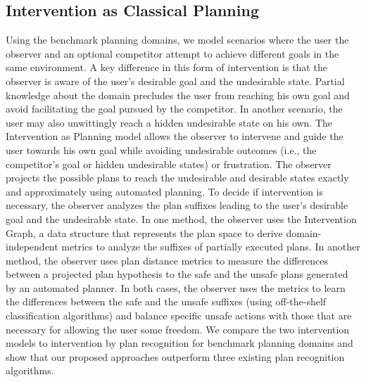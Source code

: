 \subsection{Intervention as Classical Planning}
Using the benchmark planning domains, we model scenarios where the user the observer and an optional competitor attempt to achieve different goals in the same environment.
A key difference in this form of intervention is that the observer is aware of  the user's desirable goal and the undesirable state.
Partial knowledge about the domain precludes the user from reaching his own goal and avoid facilitating the goal pursued by the competitor.
In another scenario, the user may also unwittingly reach a hidden undesirable state on his own.
The Intervention as Planning model allows the observer to intervene and guide the user towards his own goal while avoiding undesirable outcomes (i.e., the competitor's goal or hidden undesirable states) or frustration.
The observer projects the possible plans to reach the undesirable and desirable states exactly and approximately using automated planning.
To decide if intervention is necessary, the observer analyzes the plan suffixes leading to the user's desirable goal and the undesirable state.
In one method, the observer uses the Intervention Graph, a data structure that represents the plan space to derive domain-independent metrics to analyze the suffixes of partially executed plans.
In another method, the observer uses plan distance metrics to measure the differences between a projected plan hypothesis to the safe and the unsafe plans generated by an automated planner.
In both cases, the observer uses the metrics to learn the differences between the safe and the unsafe suffixes (using off-the-shelf classification algorithms) and balance specific unsafe actions with those that are necessary for allowing the user some freedom.
We compare the two intervention models to intervention by plan recognition for benchmark planning domains and show that our proposed approaches outperform three existing plan recognition algorithms.

